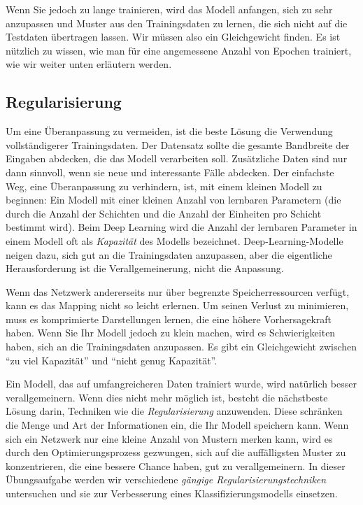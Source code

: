 \documentclass[11pt,a4paper,headinclude]{scrartcl}
\begin{document}
Wenn Sie jedoch zu lange trainieren, wird das Modell anfangen, sich zu sehr anzupassen und Muster aus den Trainingsdaten zu lernen, die sich nicht auf die Testdaten übertragen lassen. Wir müssen also ein Gleichgewicht finden. Es ist nützlich zu wissen, wie man für eine angemessene Anzahl von Epochen trainiert, wie wir weiter unten erläutern werden.

\subsection*{Regularisierung}
Um eine Überanpassung zu vermeiden, ist die beste Lösung die Verwendung vollständigerer Trainingsdaten. Der Datensatz sollte die gesamte Bandbreite der Eingaben abdecken, die das Modell verarbeiten soll. Zusätzliche Daten sind nur dann sinnvoll, wenn sie neue und interessante Fälle abdecken.
Der einfachste Weg, eine Überanpassung zu verhindern, ist, mit einem kleinen Modell zu beginnen: Ein Modell mit einer kleinen Anzahl von lernbaren Parametern (die durch die Anzahl der Schichten und die Anzahl der Einheiten pro Schicht bestimmt wird). Beim Deep Learning wird die Anzahl der lernbaren Parameter in einem Modell oft als \emph{Kapazität} des Modells bezeichnet. Deep-Learning-Modelle neigen dazu, sich gut an die Trainingsdaten anzupassen, aber die eigentliche Herausforderung ist die Verallgemeinerung, nicht die Anpassung.

Wenn das Netzwerk andererseits nur über begrenzte Speicherressourcen verfügt, kann es das Mapping nicht so leicht erlernen. Um seinen Verlust zu minimieren, muss es komprimierte Darstellungen lernen, die eine höhere Vorhersagekraft haben. Wenn Sie Ihr Modell jedoch zu klein machen, wird es Schwierigkeiten haben, sich an die Trainingsdaten anzupassen. Es gibt ein Gleichgewicht zwischen "`zu viel Kapazität"' und "`nicht genug Kapazität"'. 

Ein Modell, das auf umfangreicheren Daten trainiert wurde, wird natürlich besser verallgemeinern. Wenn dies nicht mehr möglich ist, besteht die nächstbeste Lösung darin, Techniken wie die \emph{Regularisierung} anzuwenden. Diese schränken die Menge und Art der Informationen ein, die Ihr Modell speichern kann.  Wenn sich ein Netzwerk nur eine kleine Anzahl von Mustern merken kann, wird es durch den Optimierungsprozess gezwungen, sich auf die auffälligsten Muster zu konzentrieren, die eine bessere Chance haben, gut zu verallgemeinern.
In dieser Übungsaufgabe werden wir verschiedene \emph{gängige Regularisierungstechniken} untersuchen und sie zur Verbesserung eines Klassifizierungsmodells einsetzen.
\end{document}
